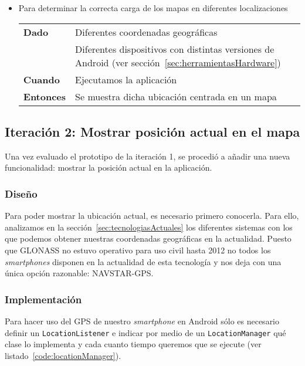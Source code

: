 \begin{itemize}
  \item Para determinar la correcta carga de los mapas en diferentes localizaciones

  \begin{tabular}{p{}p{}}
    \hline
    \textbf{Dado}     & Diferentes coordenadas geográficas \\
                      & Diferentes dispositivos con distintas versiones de Android (ver
                        sección~\ref{sec:herramientasHardware}) \\
    \textbf{Cuando}   & Ejecutamos la aplicación \\
    \textbf{Entonces} & Se muestra dicha ubicación centrada en un mapa \\
    \hline
  \end{tabular}
\end{itemize}

\subsection{Iteración 2: Mostrar posición actual en el mapa}

Una vez evaluado el prototipo de la iteración 1, se procedió a añadir una nueva funcionalidad:
mostrar la posición actual en la aplicación.

\subsubsection{Diseño}

Para poder mostrar la ubicación actual, es necesario primero conocerla. Para ello, analizamos en la
sección~\ref{sec:tecnologiasActuales} los diferentes sistemas con los que podemos obtener nuestras
coordenadas geográficas en la actualidad. Puesto que \acs{GLONASS} no estuvo operativo para uso
civil hasta 2012 no todos los \emph{smartphones} disponen en la actualidad de esta tecnología y nos
deja con una única opción razonable: \acs{NAVSTAR-GPS}.

\subsubsection{Implementación}

Para hacer uso del \acs{GPS} de nuestro \emph{smartphone} en Android sólo es necesario definir un
\texttt{LocationListener} e indicar por medio de un \texttt{LocationManager} qué clase lo implementa
y cada cuanto tiempo queremos que se ejecute (ver listado~\ref{code:locationManager}).


